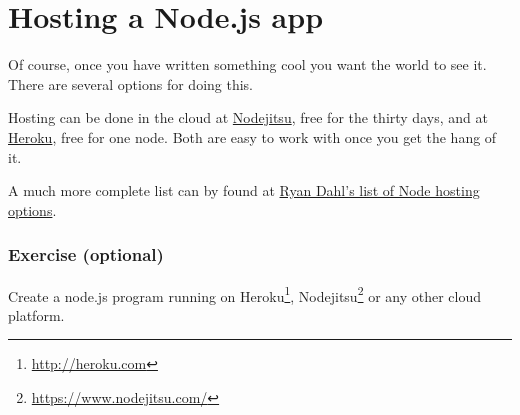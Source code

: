 \documentclass[a4paper]{report}
\begin{document}
\section*{Hosting a Node.js app} 
Of course, once you have written something cool you want the world to see it. There are several options for doing this. 
 
Hosting can be done in the cloud at \href{https://www.nodejitsu.com/}{Nodejitsu}, free for the thirty days, and at \href{https://www.heroku.com/}{Heroku}, free for one node. Both are easy to work with once you get the hang of it. 
 
A much more complete list can by found at \href{https://github.com/joyent/node/wiki/Node-Hosting}{Ryan Dahl's list of Node hosting options}. 
 
\subsubsection*{Exercise (optional)} 
Create a node.js program running on Heroku\footnote{\url{http://heroku.com}}, Nodejitsu\footnote{\url{https://www.nodejitsu.com/}} or any other cloud platform. 
 
\end{document}
